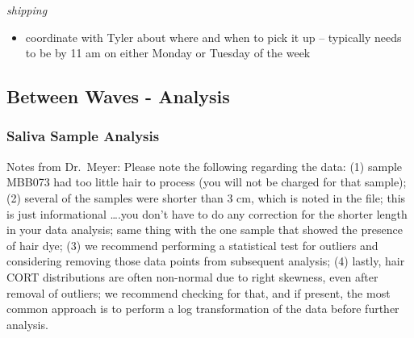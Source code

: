 \documentclass[
]{book}
\providecommand{\tightlist}{%
  \setlength{\itemsep}{0pt}\setlength{\parskip}{0pt}}
\begin{document}
\emph{shipping}

\begin{itemize}
\tightlist
\item
  coordinate with Tyler about where and when to pick it up -- typically needs to be by 11 am on either Monday or Tuesday of the week
\end{itemize}

\hypertarget{between-waves---analysis}{%
\subsection{Between Waves - Analysis}\label{between-waves---analysis}}

\hypertarget{saliva-sample-analysis}{%
\subsubsection{Saliva Sample Analysis}\label{saliva-sample-analysis}}

Notes from Dr.~Meyer: Please note the following regarding the data: (1) sample MBB073 had too little hair to process (you will not be charged for that sample); (2) several of the samples were shorter than 3 cm, which is noted in the file; this is just informational \ldots.you don't have to do any correction for the shorter length in your data analysis; same thing with the one sample that showed the presence of hair dye; (3) we recommend performing a statistical test for outliers and considering removing those data points from subsequent analysis; (4) lastly, hair CORT distributions are often non-normal due to right skewness, even after removal of outliers; we recommend checking for that, and if present, the most common approach is to perform a log transformation of the data before further analysis.

  
\end{document}
